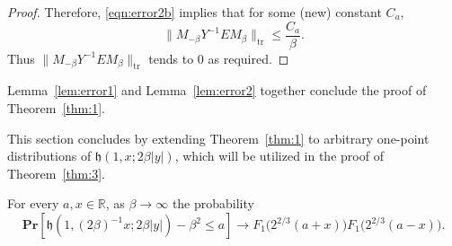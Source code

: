 \documentclass[10pt]{amsart}
\theoremstyle{definition}\newtheorem{defi}[theo]{Definition}\newtheorem{rema}[theo]{Remark}\newtheorem{exam}[theo]{Example}\newtheorem{exem}[theo]{Example}\newtheorem{nota}[theo]{Notation}
\DeclareMathOperator{\tr}{tr}
\newcommand{\pr}[1]{\mathbf{Pr}\left[#1\right]}
\newcommand{\R}{\mathbb{R}}
\newcommand{\h}{\mathfrak{h}}
\begin{document}
\begin{proof}
Therefore, \eqref{eqn:error2b} implies that for some (new) constant $C_a$,
\[
\| M_{-\beta}Y^{-1} E M_{\beta}\|_{\tr} \leq \frac{C_a}{\beta}.
\]
Thus $\| M_{-\beta}Y^{-1} E M_{\beta}\|_{\tr}$ tends to $0$ as required.
\end{proof}

Lemma~\ref{lem:error1} and Lemma~\ref{lem:error2} together conclude the proof of Theorem~\ref{thm:1}.

This section concludes by extending Theorem~\ref{thm:1} to arbitrary one-point distributions of $\h(1,x;2\beta|y|)$, which will be utilized in the proof of Theorem~\ref{thm:3}.

\begin{prop}\label{prop:1}
For every $a, x \in \R$, as $\beta \to \infty$ the probability
\[
\pr{\h(1, (2\beta)^{-1}x; 2\beta |y|) - \beta^2 \leq a} \longrightarrow F_1\big (2^{2/3}(a+x)\big) F_1\big(2^{2/3}(a-x)\big).
\]
\end{prop}
\end{document}
